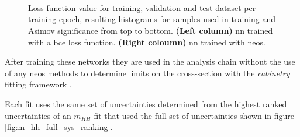 \begin{figure}
    \centering
     \\
     \\
     \\
    \caption[]{Loss function value for training, validation and test dataset per training epoch, resulting histograms for samples used in training and Asimov significance from top to bottom. \textbf{(Left column)} \ac{nn} trained with a \ac{bce} loss function. \textbf{(Right coloumn)} \ac{nn} trained with \ac{neos}.  }
    \label{fig:training_metrics}
\end{figure}




After training these networks they are used in the analysis chain without the use of any \ac{neos} methods to determine limits on the cross-section with the \textit{cabinetry} fitting framework \citep{cranmer_2021_4627038}.

Each fit uses the same set of uncertainties determined from the highest ranked uncertainties of an $m_{HH}$ fit that used the full set of uncertainties shown in figure \ref{fig:m_hh_full_sys_ranking}.


